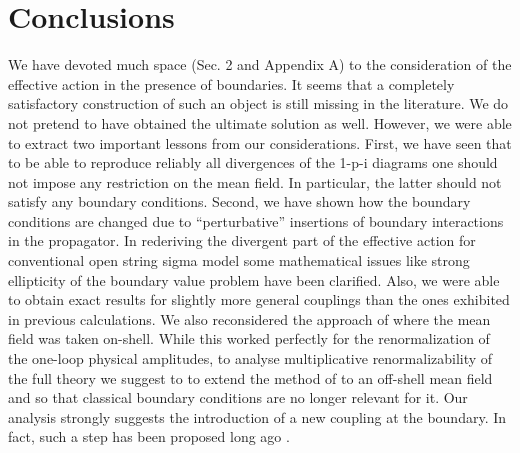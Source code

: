 \documentclass[a4paper,12pt]{article}
\begin{document}
\section{Conclusions}
We have devoted much space (Sec. 2 and Appendix A) to the
consideration of the effective action in the presence
of boundaries. It seems that a completely satisfactory
construction of such an object is still missing in the
literature.  We do not pretend to have obtained  the ultimate
solution as well. However, we were able to  extract two important lessons
from our considerations. First,
we have seen that to be able to reproduce reliably
all divergences of the 1-p-i diagrams one should not
impose any restriction on the mean field. In particular,
the latter should not satisfy any boundary conditions.
Second, we have shown how the boundary conditions are
changed due to ``perturbative'' insertions of boundary
interactions in the propagator. In rederiving
the divergent part of the effective action
for conventional open string sigma model some mathematical
issues like strong ellipticity of the boundary value problem
have been clarified. Also, we were able to obtain exact results
for slightly more general couplings than the ones exhibited
in previous calculations.
We also reconsidered the approach of \cite{Callan88} where
the mean field \coordHE{} was taken on-shell. While this
worked perfectly for the renormalization of the
one-loop physical amplitudes, to analyse multiplicative
renormalizability of the full theory we suggest to
to extend the method of \cite{Callan88}
 to an off-shell mean field \coordHE{} and so that
classical boundary conditions are no longer relevant for it. 
Our analysis strongly suggests the
introduction of a new coupling \coordHE{}
at the boundary. In fact, such  a step has been proposed
long ago \cite{dornotto86}. 
\end{document}

